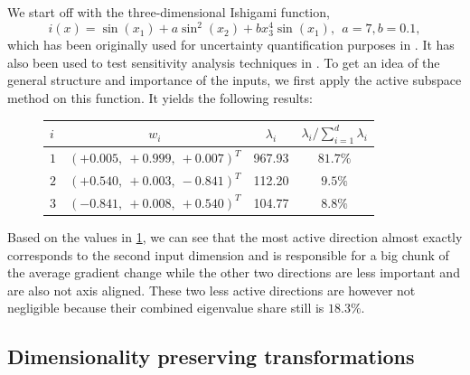 \documentclass[
  a4paper,  %
  twoside,  %
  bibliography=totoc,
  headsepline,
  cleardoublepage=empty,
  parskip=half,
  draft=false
]{scrbook}
\begin{document}
We start off with the three-dimensional Ishigami function,
\begin{equation}
i(x)=\sin(x_1) + a \sin^2(x_2) + b x_3^4 \sin(x_1), ~~ a = 7, b=0.1,
\end{equation}
%
which has been originally used for uncertainty quantification purposes in \cite{Ishigami1990AnIQ}.
It has also been used to test sensitivity analysis techniques in \cite{Sobol1999}.
To get an idea of the general structure and importance of the inputs, we first apply the active subspace method on this function. It yields the following results:
\begin{mdframed}[style=style]
\begin{figure}[H]
\centering

\bgroup
\def\arraystretch{1.2}%
  \begin{tabular}{ l | c c c}
$i$ & $w_i$ & $\lambda_i$ & $\lambda_i / \sum_{i=1}^d \lambda_i$\\
\hline
$1$ & $(+0.005, ~+0.999, ~+0.007)^T$ & 967.93 & $81.7\%$\\
$2$  & $(+0.540, ~+0.003, ~-0.841)^T$ & 112.20 & $9.5\%$\\
$3$ & $(-0.841, ~+0.008, ~+0.540)^T$ & 104.77 & $8.8\%$\\
\end{tabular}
\egroup
\vspace{0.5em}

\delimit

\label{tab:ishigami_as}
\end{figure}
\end{mdframed}
%
Based on the values in \cref{tab:ishigami_as}, we can see that the most active direction almost exactly corresponds to the second input dimension and is responsible for a big chunk of the average gradient change while the other two directions are less important and are also not axis aligned.
These two less active directions are however not negligible because their combined eigenvalue share still is $18.3\%$.

\subsection{Dimensionality preserving transformations}
\end{document}
